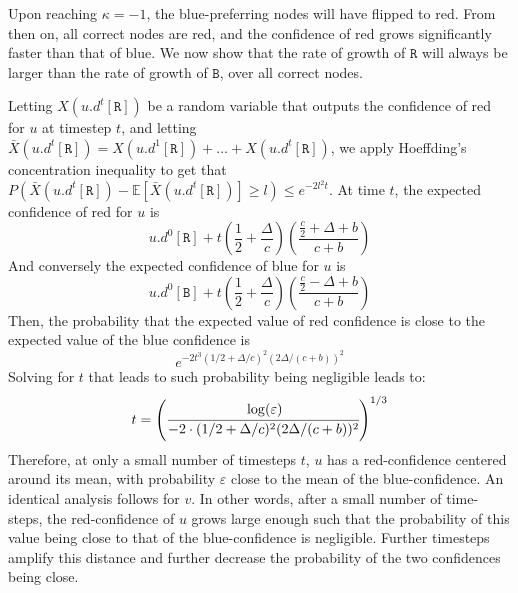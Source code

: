 \documentclass[letterpaper,twocolumn,10pt]{article}
\theoremstyle{definition}
\begin{document}
\begin{appendices}
{Upon reaching $\kappa = -1$, the blue-preferring nodes will have flipped to red.
From then on, all correct nodes are red, and the confidence of red grows significantly faster than that of blue.
We now show that the rate of growth of $\mathtt{R}$ will always be larger than the rate of growth of $\mathtt{B}$, over all correct nodes. 

Letting $X({u.d}^t[\mathtt{R}])$ be a random variable that outputs the confidence of red for $u$ at timestep $t$, and letting $\bar X({u.d}^t[\mathtt{R}]) = X({u.d}^1[\mathtt{R}]) + \dots + X({u.d}^t[\mathtt{R}])$, we apply Hoeffding's concentration inequality to get that $P({\bar X({u.d}^t[\mathtt{R}])} - \mathbb{E}[\bar X({u.d}^t[\mathtt{R}])] \geq l) \leq e^{-2l^2t}$.
At time $t$, the expected confidence of red for $u$ is
\begin{equation}
    {u.d}^0[\mathtt{R}] + t\left(\frac{1}{2} + \frac{\Delta}{c}\right)\left(\frac{\frac{c}{2} + \Delta + b}{c+b}\right)
\end{equation}
And conversely the expected confidence of blue for $u$ is
\begin{equation}
    {u.d}^0[\mathtt{B}] + t\left(\frac{1}{2} + \frac{\Delta}{c}\right)\left(\frac{\frac{c}{2} - \Delta + b}{c+b}\right)
\end{equation}
Then, the probability that the expected value of red confidence is close to the expected value of the blue confidence is
\begin{equation}
    e^{-2t^3(1/2 + \Delta/c)^2(2\Delta/(c+b))^2}
    \label{equation:concentration_mean}
\end{equation}
Solving for $t$ that leads to such probability being negligible leads to:
\begin{equation}
    t = \left(\cfrac{\log(\varepsilon)}{-2\cdot(1/2 + \Delta/c)^2(2\Delta/(c+b))^2}\right)^{1/3}
    \label{equation:minimal_time}
\end{equation}
Therefore, at only a small number of timesteps $t$, $u$ has a red-confidence centered around its mean, with probability $\varepsilon$ close to the mean of the blue-confidence. An identical analysis follows for $v$.
In other words, after a small number of time-steps, the red-confidence of $u$ grows large enough such that the probability of this value being close to that of the blue-confidence is negligible. Further timesteps amplify this distance and further decrease the probability of the two confidences being close. 
}


\end{appendices}
\end{document}

